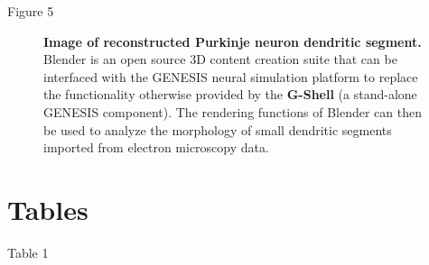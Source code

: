 \documentclass[10pt]{article}
\begin{document}
\clearpage

Figure 5

\begin{figure}[ht]
\begin{center}
\end{center}
\caption{
{\bf Image of reconstructed Purkinje neuron dendritic segment.} Blender is an open source 3D content creation suite that can be interfaced with the GENESIS neural simulation platform to replace the functionality otherwise provided by the {\bf G-Shell} (a stand-alone GENESIS component). The rendering functions of Blender can then be used to analyze the morphology of small dendritic segments imported from electron microscopy data.
}
\label{fig:cbi-blender}
\end{figure}

\clearpage

\section*{\LARGE Tables}

Table 1
\end{document}
